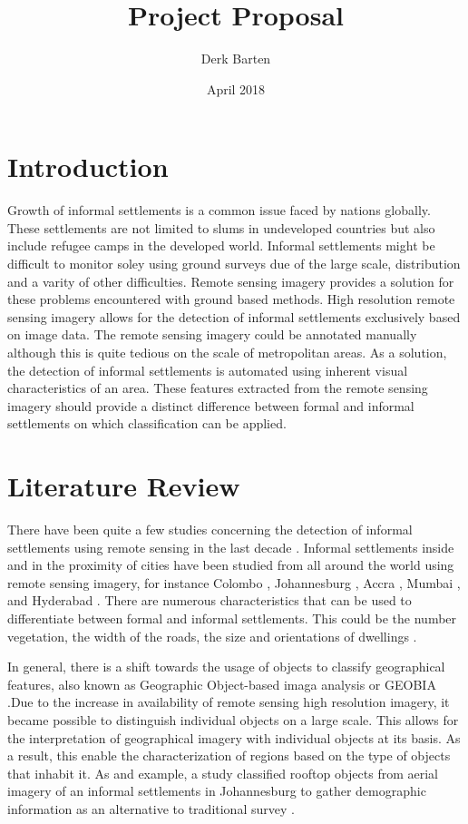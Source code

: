 \documentclass{article}
\title{Project Proposal}
\author{Derk Barten}
\date{April 2018}
\begin{document}
\maketitle

\section{Introduction}


Growth of informal settlements is a common issue faced by nations globally.
These settlements are not limited to slums in undeveloped countries but also
include refugee camps in the developed world. Informal settlements might be
difficult to monitor soley using ground surveys due of the large scale,
distribution and a varity of other difficulties. Remote sensing imagery
provides a solution for these problems encountered with ground based methods.
High resolution remote sensing imagery allows for the detection of informal
settlements exclusively based on image data.
The remote sensing imagery could be annotated manually although this is quite
tedious on the scale of metropolitan areas. As a solution, the detection of informal
settlements is automated using inherent visual characteristics of an area. These features extracted from the remote sensing
imagery should provide a distinct difference between formal and informal
settlements on which classification can be applied. 

\section{Literature Review}

There have been quite a few studies concerning the detection of informal
settlements using remote sensing in the last decade \cite{kuffer2016slums}.
Informal settlements inside and in the proximity of cities have been studied
from all around the world using remote sensing imagery, for instance Colombo
\cite{colombo}, Johannesburg \cite{williams2016automatic}, Accra \cite{accra},
Mumbai \cite{mumbai}, and Hyderabad \cite{hyderabad}. There are numerous
characteristics that can be used to differentiate between formal and informal
settlements. This could be the number vegetation, the width of the roads, the
size and orientations of dwellings \cite{owen2013approach}.

In general, there is a shift towards the usage of objects to classify geographical
features, also known as Geographic Object-based imaga analysis or GEOBIA
\cite{hay2008geographic}.Due to the increase in availability of remote sensing
high resolution imagery, it became possible to distinguish individual objects
on a large scale.  This allows for the
interpretation of geographical imagery with individual objects at its basis.
As a result,  this enable the characterization of regions based on the type of objects
that inhabit it.  As and example, a study classified rooftop objects from
aerial imagery of an informal settlements in Johannesburg to gather demographic
information as an alternative to traditional survey
\cite{williams2016automatic}.
\end{document}
